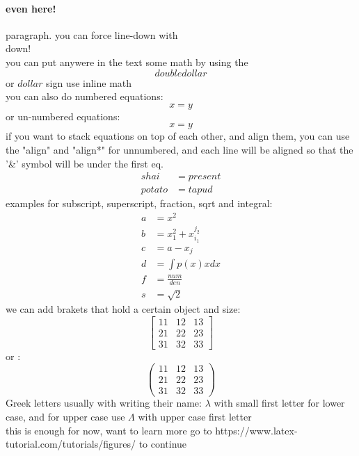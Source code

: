 \documentclass{article}
\begin{document}
	\paragraph{even here!}
	paragraph. you can force line-down with \\
	down!
	\\
	you can put anywere in the text some math by using the $$double dollar$$ or $dollar$ sign use inline math \\
	you can also do numbered equations:
	\begin{equation}
	x=y
	\end{equation}
	or un-numbered equations:
	\begin{equation*}
	x=y
	\end{equation*}
	if you want to stack equations on top of each other, and align them, you can use the "align" and "align*" for unnumbered, and each line will be aligned so that the '\&' symbol will be under the first eq.
	\begin{align}
	shai&=present \\
	potato&=tapud	
	\end{align}
	examples for subscript, superscript, fraction, sqrt and integral:
	\begin{align*}
	a &= x^2 \\
	b &= x_1^2 + x_{i_1}^{j_2} \\
	c &= a - x_j \\ 
	d &= \int p(x)xdx \\
	f &= \frac{num}{den} \\
	s &= \sqrt{2}
	\end{align*}
	we can add brakets that hold a certain object and size:
	\begin{equation*}
	\left[
	\begin{matrix}
	11 & 12 & 13 \\
	21 & 22 & 23 \\
	31 & 32 & 33
	\end{matrix}
	\right]
	\end{equation*}
	or :
	\begin{equation*}
	\left(
	\begin{matrix}
	11 & 12 & 13 \\
	21 & 22 & 23 \\
	31 & 32 & 33
	\end{matrix}
	\right)
	\end{equation*}
	Greek letters usually with writing their name: $\lambda$ with small first letter for lower case, and for upper case use $\Lambda$ with upper case first letter
	\\
	this is enough for now, want to learn more go to https://www.latex-tutorial.com/tutorials/figures/ 
	to continue\\
	
\end{document}
